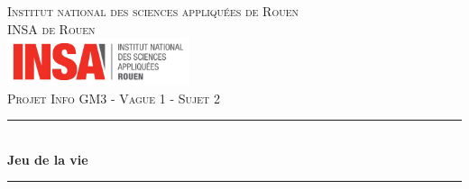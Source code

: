 \documentclass[12,french]{report}
\newcommand{\HRule}{\rule{\linewidth}{0.5mm}}
\begin{document}
\hypersetup{pdfborder=0 0 0}

\begin{titlepage}

\begin{center}
	\textsc{{\LARGE Institut national des sciences appliquées de Rouen} \\ 			\vspace{6mm} {\Large INSA de Rouen}} \\
	\vspace{5mm}
	\includegraphics[width=0.4\textwidth]{./Images/insa}\\[1.0 cm]

	\textsc{\Large Projet Info GM3 - Vague 1 - Sujet 2}\\[0.5cm]

	\HRule \\[0.5cm]
	{ \Huge \bfseries Jeu de la vie}\\[0.2cm]
	\HRule \\[0.95cm]


\end{center}
\end{titlepage}
\end{document}

